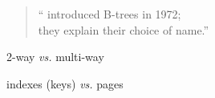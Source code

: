 
\begin{frame}{}


  \pause
  \vspace{0.60cm}
  \begin{quote}
    \centering
    `` introduced B-trees in 1972; \\[5pt]
    they  explain their choice of name.''
  \end{quote}
\end{frame}


\begin{frame}{}

  \vspace{0.60cm}
  \begin{center}
    2-way \emph{vs.} multi-way
  \end{center}
\end{frame}

\begin{frame}{}

  \vspace{0.60cm}
  \begin{center}
    indexes (keys) \emph{vs.} pages
  \end{center}
\end{frame}
